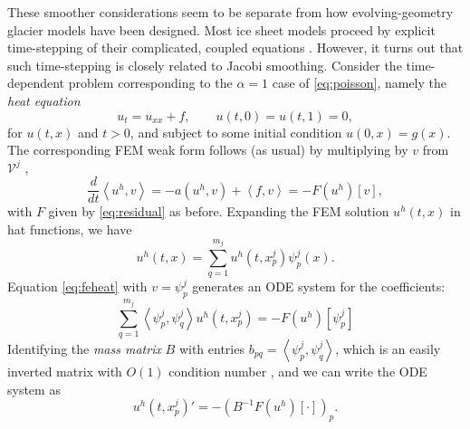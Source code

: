 \documentclass[letterpaper,final,12pt,reqno]{amsart}
\theoremstyle{claim}
\newcommand{\ip}[2]{\left<#1,#2\right>}
\numberwithin{equation}{section}
\numberwithin{figure}{section}
\numberwithin{table}{section}
\numberwithin{theorem}{section}
\begin{document}
These smoother considerations seem to be separate from how evolving-geometry glacier models have been designed.  Most ice sheet models proceed by explicit time-stepping of their complicated, coupled equations \cite[for example]{Winkelmannetal2011}.  However, it turns out that such time-stepping is closely related to Jacobi smoothing.  Consider the time-dependent problem corresponding to the $\alpha=1$ case of \eqref{eq:poisson}, namely the \emph{heat equation}
\begin{equation}
u_t = u_{xx} + f, \qquad u(t,0)=u(t,1)=0, \label{eq:heat}
\end{equation}
for $u(t,x)$ and $t>0$, and subject to some initial condition $u(0,x)=g(x)$.  The corresponding FEM weak form follows (as usual) by multiplying by $v$ from $\mathcal{V}^j$ \cite[Chapter 8]{Johnson2009},
\begin{equation}
\frac{d}{dt}\ip{u^h}{v} = -a(u^h,v) + \ip{f}{v} = - F(u^h)[v], \label{eq:feheat}
\end{equation}
with $F$ given by \eqref{eq:residual} as before.  Expanding the FEM solution $u^h(t,x)$ in hat functions, we have
\begin{equation}
u^h(t,x) = \sum_{q=1}^{m_j} u^h(t,x_p^j) \psi_p^j(x). \label{eq:trialheat}
\end{equation}
Equation \eqref{eq:feheat} with $v=\psi_p^j$ generates an ODE system for the coefficients:
\begin{equation}
\sum_{q=1}^{m_j} \ip{\psi_p^j}{\psi_q^j} u^h(t,x_p^j) = - F(u^h)[\psi_p^j] \label{eq:odeheatearly}
\end{equation}
Identifying the \emph{mass matrix} $B$ with entries $b_{pq} = \ip{\psi_p^j}{\psi_q^j}$, which is an easily inverted matrix with $O(1)$ condition number \cite{Elmanetal2014}, and we can write the ODE system as
\begin{equation}
u^h(t,x_p^j)' = - (B^{-1} F(u^h)[\cdot])_p. \label{eq:odeheat}
\end{equation}
\end{document}
